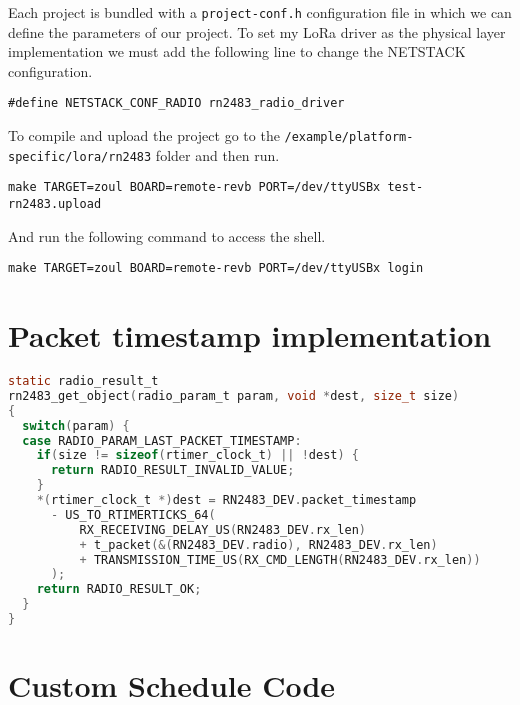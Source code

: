 Each project is bundled with a \lstinline{project-conf.h}
configuration file in which we can define the parameters of our project.
To set my LoRa driver as the physical layer implementation we must add the
following line to change the NETSTACK configuration.

\begin{lstlisting}
#define NETSTACK_CONF_RADIO rn2483_radio_driver
\end{lstlisting}

To compile and upload the project go to the
\lstinline{/example/platform-specific/lora/rn2483}
folder and then run.

\begin{lstlisting}
make TARGET=zoul BOARD=remote-revb PORT=/dev/ttyUSBx test-rn2483.upload
\end{lstlisting}

And run the following command to access the shell.

\begin{lstlisting}
make TARGET=zoul BOARD=remote-revb PORT=/dev/ttyUSBx login
\end{lstlisting}


\section{Packet timestamp implementation\label{code:timestampimpl}}

\begin{lstlisting}[language=c]
static radio_result_t
rn2483_get_object(radio_param_t param, void *dest, size_t size)
{
  switch(param) {
  case RADIO_PARAM_LAST_PACKET_TIMESTAMP:
    if(size != sizeof(rtimer_clock_t) || !dest) {
      return RADIO_RESULT_INVALID_VALUE;
    }
    *(rtimer_clock_t *)dest = RN2483_DEV.packet_timestamp
      - US_TO_RTIMERTICKS_64(
          RX_RECEIVING_DELAY_US(RN2483_DEV.rx_len)
          + t_packet(&(RN2483_DEV.radio), RN2483_DEV.rx_len)
          + TRANSMISSION_TIME_US(RX_CMD_LENGTH(RN2483_DEV.rx_len))
      );
    return RADIO_RESULT_OK;
  }
}
\end{lstlisting}



\section{Custom Schedule Code\label{code:customsched}}

